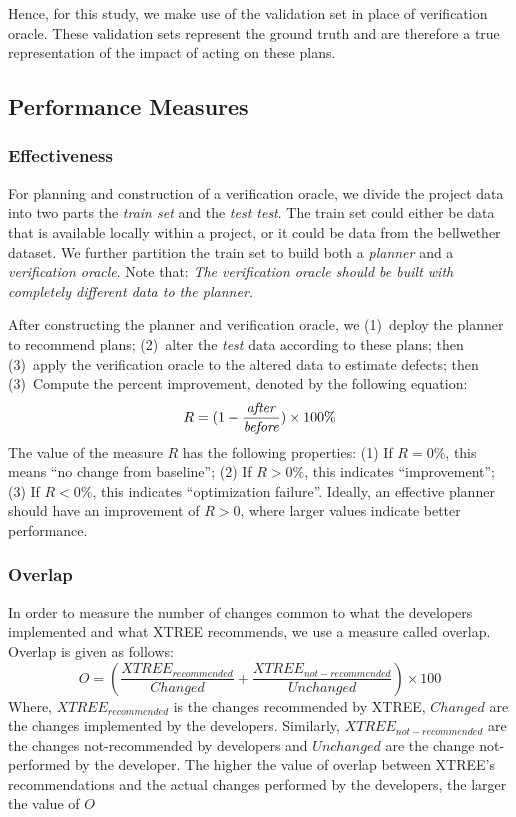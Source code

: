 \documentclass[sigconf, proceedings, 9pt]{acmart}
\begin{document}
Hence, for this study, we make use of the validation set in place of 
verification oracle. These validation sets represent the ground truth and are 
therefore a true representation of the impact of acting on these plans.

\subsection{Performance Measures}
\label{sect:evaluation}

\subsubsection{Effectiveness}
\label{sect:effectiveness}
For planning and construction of a verification oracle, we divide the
project data into two parts the \textit{train set} and the \textit{test test}.
The train set could either be data that is available locally within a project, 
or it could be data from the bellwether dataset. We further partition the train 
set to build both a {\em planner} and a {\em verification oracle}. Note that: 
{\em The verification oracle should be built with completely different data to 
the planner.}

After constructing the planner and verification oracle, we (1)~deploy the 
{planner} to recommend plans; (2)~alter the {\em test} data according to these 
plans;
then (3)~apply the {verification oracle} to the altered data to estimate 
defects; then (3)~Compute the percent improvement, denoted by the following 
equation:
\begin{equation}
\small
\label{eq:effectiveness}
R=(1-\frac{\mathit{after}}{\mathit{before}})\times100\%
\end{equation}
The value of the measure $R$ has the following properties: (1) If $R = 0\%$, 
this means  ``no change from baseline''; 
(2) If $R > 0\%$, this indicates ``improvement'';
(3) If $R < 0\%$, this indicates ``optimization failure''. Ideally, an 
effective planner should have an improvement of $R>0$, where larger values 
indicate better performance. 
\subsubsection{Overlap}
\label{overlap} In order to measure the number of changes common to what the 
developers implemented and what XTREE recommends, we use a measure called 
overlap. Overlap is given as follows:
\begin{equation}
\label{eq:overlap}
O = \left(\frac{{XTRE{E_{recommended}}}}{{Changed}} + \frac{{XTRE{E_{not - 
recommended}}}}{{Unchanged}}\right)\times100
\end{equation}
Where, $XTRE{E_{recommended}}$ is the changes recommended by XTREE, $Changed$ 
are the changes implemented by the developers. Similarly, $XTRE{E_{not - 
		recommended}}$ are the changes not-recommended by developers and $Unchanged$ 
		are the change not-performed by the developer. The higher the value of 
		overlap between XTREE's recommendations and the actual changes performed by 
		the developers, the larger the value of $O$
\end{document}

